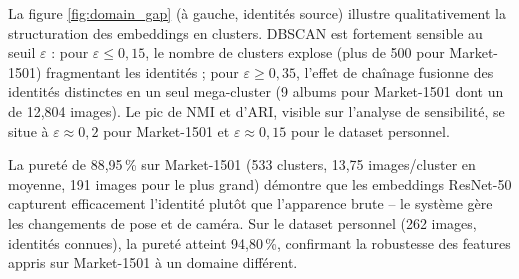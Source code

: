 La figure \ref{fig:domain_gap} (à gauche, identités source) illustre qualitativement la structuration des embeddings en clusters. DBSCAN est fortement sensible au seuil $\varepsilon$ : pour $\varepsilon \leq 0{,}15$, le nombre de clusters explose (plus de 500 pour Market-1501) fragmentant les identités ; pour $\varepsilon \geq 0{,}35$, l'effet de chaînage fusionne des identités distinctes en un seul mega-cluster (9 albums pour Market-1501 dont un de 12,804 images). Le pic de NMI et d'ARI, visible sur l'analyse de sensibilité, se situe à $\varepsilon \approx 0{,}2$ pour Market-1501 et $\varepsilon \approx 0{,}15$ pour le dataset personnel.

La pureté de 88,95\,\% sur Market-1501 (533 clusters, 13,75 images/cluster en moyenne, 191 images pour le plus grand) démontre que les embeddings ResNet-50 capturent efficacement l'identité plutôt que l'apparence brute -- le système gère les changements de pose et de caméra. Sur le dataset personnel (262 images, identités connues), la pureté atteint 94,80\,\%, confirmant la robustesse des features appris sur Market-1501 à un domaine différent.
